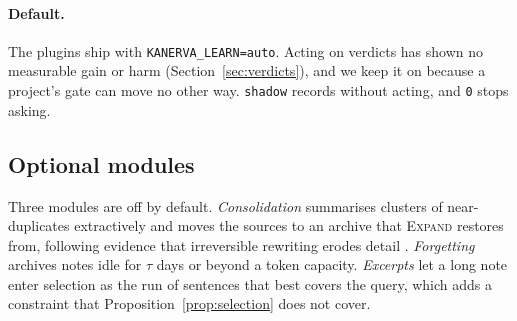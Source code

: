 \paragraph{Default.} The plugins ship with \texttt{KANERVA\_LEARN=auto}. Acting on verdicts has shown no measurable gain or harm (Section~\ref{sec:verdicts}), and we keep it on because a project's gate can move no other way. \texttt{shadow} records without acting, and \texttt{0} stops asking.

\subsection{Optional modules}
Three modules are off by default. \emph{Consolidation} summarises clusters of near-duplicates extractively and moves the sources to an archive that \textsc{Expand} restores from, following evidence that irreversible rewriting erodes detail \cite{colaco2026ratedistortion,zhang2025ace}. \emph{Forgetting} archives notes idle for $\tau$ days or beyond a token capacity. \emph{Excerpts} let a long note enter selection as the run of sentences that best covers the query, which adds a constraint that Proposition~\ref{prop:selection} does not cover.
